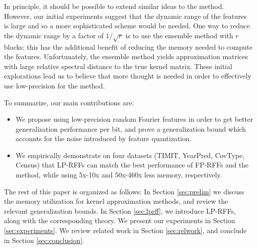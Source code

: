 In principle, it should be possible to extend similar ideas to the \Nystrom method. However, our initial experiments suggest that the dynamic range of the features is large and so a more sophisticated scheme would be needed. One way to reduce the dynamic range by a factor of $1/\sqrt{r}$ is to use the ensemble \Nystrom method \citep{ensemble09} with $r$ blocks; this has the additional benefit of reducing the memory needed to compute the features. Unfortunately, the ensemble method yields approximation matrices with large relative spectral distance to the true kernel matrix. These initial explorations lead us to believe that more thought is needed in order to effectively use low-precision for the \Nystrom method.

To summarize, our main contributions are:
\begin{itemize}
	\item We propose using low-precision random Fourier features in order to get better generalization performance per bit, and prove a generalization bound which accounts for the noise introduced by feature quantization.
	\item We empirically demonstrate on four datasets (TIMIT, YearPred, CovType, Census) that LP-RFFs can match the best performance of FP-RFFs and the \Nystrom method, while using 5x-10x and 50x-460x less memory, respectively.
\end{itemize}

The rest of this paper is organized as follows: In Section \ref{sec:prelim} we discuss the memory utilization for kernel approximation methods, and review the relevant generalization bounds.  In Section \ref{sec:lprff}, we introduce LP-RFFs, along with the corresponding theory. We present our experiments in Section \ref{sec:experiments}.  We review related work in Section \ref{sec:relwork}, and conclude in Section \ref{sec:conclusion}.
